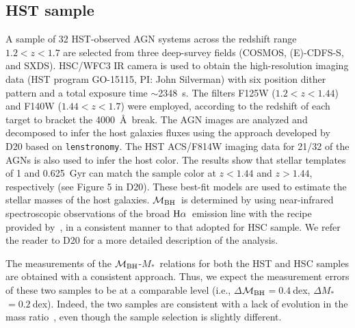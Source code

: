 \documentclass[twocolumn]{aastex631}
\def\smass{{$M_*$}}
\def\halpha{${\rm H}\alpha$}
\def\mbh{$\mathcal M_{\rm BH}$}
\begin{document}
\subsection{HST sample}

A sample of 32 HST-observed AGN systems across the redshift range $1.2<z<1.7$ are selected from three deep-survey fields (COSMOS, (E)-CDFS-S, and SXDS). HSC/WFC3 IR camera is used to obtain the high-resolution imaging data (HST program GO-15115, PI: John Silverman) with six position dither pattern and a total exposure time $\sim$2348~s. The filters F125W ($1.2<z<1.44$) and F140W ($1.44<z<1.7$) were employed, according to the redshift of each target to bracket the 4000~\AA~break.  The AGN images are analyzed and decomposed to infer the host galaxies fluxes using the approach developed by D20 based on {\tt lenstronomy}. The HST ACS/F814W imaging data for 21/32 of the AGNs is also used to infer the host color. The results show that stellar templates of 1 and 0.625~Gyr can match the sample color at $z<1.44$ and $z>1.44$, respectively (see Figure 5 in D20). These best-fit models are used to estimate the stellar masses of the host galaxies. \mbh\ is determined by \citet{Schulze2018} using near-infrared spectroscopic observations of the broad \halpha\ emission line with the recipe provided by~\citet{Vestergaard2006}, in a consistent manner to that adopted for HSC sample. We refer the reader to D20 for a more detailed description of the analysis. 

The measurements of the \mbh-\smass\ relations for both the HST and HSC samples are obtained with a consistent approach. Thus, we expect the measurement errors of these two samples to be at a comparable level (i.e., $\Delta$\mbh$=0.4~$dex, $\Delta$\smass$=0.2~$dex). 
Indeed, the two samples are consistent with a lack of evolution in the mass ratio~\citep[see Figure 6 of][]{2021arXiv210902751L}, even though the sample selection is slightly different.
\end{document}
